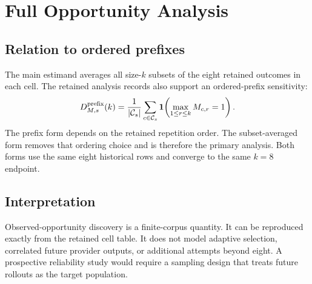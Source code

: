 \section{Full Opportunity Analysis}
\label{app:opportunity}



\subsection{Relation to ordered prefixes}

The main estimand averages all size-$k$ subsets of the eight retained outcomes in each cell. The retained analysis records also support an ordered-prefix sensitivity:
\[
D^{\mathrm{prefix}}_{M,s}(k)
=
\frac{1}{|\mathcal C_s|}
\sum_{c\in\mathcal C_s}
\mathbf{1}\!\left(\max_{1\le r\le k}M_{c,r}=1\right).
\]
The prefix form depends on the retained repetition order. The subset-averaged form removes that ordering choice and is therefore the primary analysis. Both forms use the same eight historical rows and converge to the same $k=8$ endpoint.

\subsection{Interpretation}

Observed-opportunity discovery is a finite-corpus quantity. It can be reproduced exactly from the retained cell table. It does not model adaptive selection, correlated future provider outputs, or additional attempts beyond eight. A prospective reliability study would require a sampling design that treats future rollouts as the target population.
